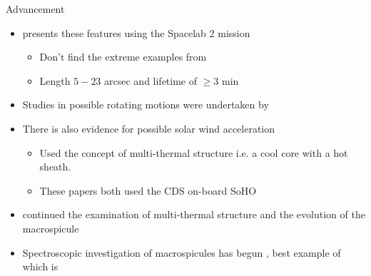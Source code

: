 \documentclass{beamer}
\begin{document}
	\begin{frame}{Advancement}
		\begin{itemize}
			\item{\cite{Dere89} presents these features using the Spacelab 2 mission}
				\begin{itemize}
					\item{Don't find the extreme examples from \cite{Bohlin1975}}
					\item{Length $5 - 23$ arcsec and lifetime of $\geq 3$ min}
				\end{itemize}
			\item{Studies in possible rotating motions were undertaken by \cite{Pike_Mason1998}}
			\item{There is also evidence for possible solar wind acceleration \cite{Pike_Harrison1997}}
				\begin{itemize}
					\item{Used the concept of multi-thermal structure i.e. a cool core with a hot sheath.}
					\item{These papers both used the CDS on-board SoHO} 
				\end{itemize}
			\item{\cite{Parenti2002} continued the examination of multi-thermal structure and the evolution of the macrospicule}
			\item{Spectroscopic investigation of macrospicules has begun , best example of which is \cite{Scullion2010}}
		\end{itemize}
	\end{frame}
	
\end{document}
